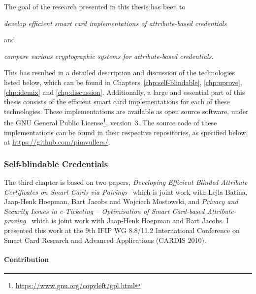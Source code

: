 The goal of the research presented in this thesis has been to
\begin{center}\it
  develop efficient smart card implementations of attribute-based credentials
\end{center}
and
\begin{center}\it
  compare various cryptographic systems for attribute-based credentials.
\end{center}
This has resulted in a detailed description and discussion of the technologies
listed below, which can be found in Chapters~\ref{chp:self-blindable},
\ref{chp:uprove}, \ref{chp:idemix} and \ref{chp:discussion}. Additionally, a
large and essential part of this thesis consists of the efficient smart card
implementations for each of these technologies. These implementations are
available as open source software, under the GNU General Public
License\footnote{\url{https://www.gnu.org/copyleft/gpl.html}}, version~3. The
source code of these implementations can be found in their respective
repositories, as specified below, at \url{https://github.com/pimvullers/}.

\subsubsection{Self-blindable Credentials}

The third chapter is based on two papers, \emph{Developing Efficient Blinded
Attribute Certificates on Smart Cards via Pairings}~\cite{BatinaHJMV10} which
is joint work with Lejla Batina, Jaap-Henk Hoepman, Bart Jacobs and Wojciech
Mostowski, and \emph{Privacy and Security Issues in e-Ticketing -- Optimisation
of Smart Card-based Attribute-proving}~\cite{HoepmanJV10} which is joint work
with Jaap-Henk Hoepman and Bart Jacobs. I presented this work at the 9th IFIP WG
8.8/11.2 International Conference on Smart Card Research and Advanced
Applications (CARDIS 2010).

\paragraph{Contribution}

